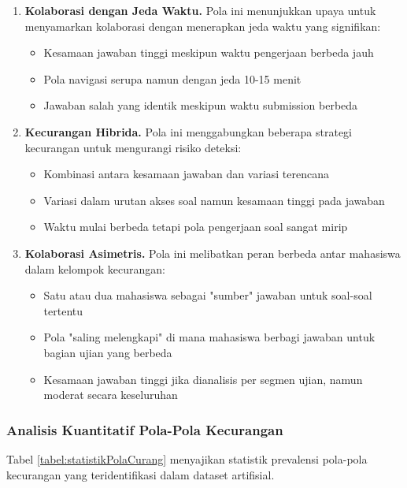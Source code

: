 \begin{enumerate}
    \item \textbf{Kolaborasi dengan Jeda Waktu.} Pola ini menunjukkan upaya untuk menyamarkan kolaborasi dengan menerapkan jeda waktu yang signifikan:
    \begin{itemize}
        \item Kesamaan jawaban tinggi meskipun waktu pengerjaan berbeda jauh
        \item Pola navigasi serupa namun dengan jeda 10-15 menit
        \item Jawaban salah yang identik meskipun waktu submission berbeda
    \end{itemize}

    \item \textbf{Kecurangan Hibrida.} Pola ini menggabungkan beberapa strategi kecurangan untuk mengurangi risiko deteksi:
    \begin{itemize}
        \item Kombinasi antara kesamaan jawaban dan variasi terencana
        \item Variasi dalam urutan akses soal namun kesamaan tinggi pada jawaban
        \item Waktu mulai berbeda tetapi pola pengerjaan soal sangat mirip
    \end{itemize}

    \item \textbf{Kolaborasi Asimetris.} Pola ini melibatkan peran berbeda antar mahasiswa dalam kelompok kecurangan:
    \begin{itemize}
        \item Satu atau dua mahasiswa sebagai "sumber" jawaban untuk soal-soal tertentu
        \item Pola "saling melengkapi" di mana mahasiswa berbagi jawaban untuk bagian ujian yang berbeda
        \item Kesamaan jawaban tinggi jika dianalisis per segmen ujian, namun moderat secara keseluruhan
    \end{itemize}
\end{enumerate}

\subsubsection{Analisis Kuantitatif Pola-Pola Kecurangan}

Tabel \ref{tabel:statistikPolaCurang} menyajikan statistik prevalensi pola-pola kecurangan yang teridentifikasi dalam dataset artifisial.

